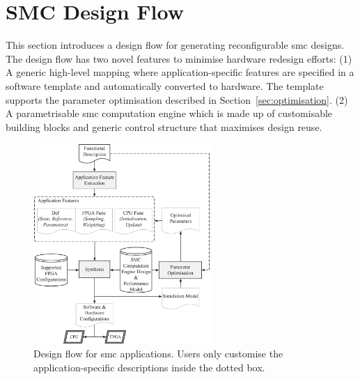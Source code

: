 

\section{SMC Design Flow}
\label{sec:design}

This section introduces a design flow for generating reconfigurable \gls{smc} 
designs. The design flow has two novel features to minimise hardware redesign efforts:
(1) A generic high-level mapping where application-specific features are specified in a software template and automatically converted to hardware.
The template supports the parameter optimisation described in Section~\ref{sec:optimisation}.
(2) A parametrisable \gls{smc} computation engine which is made up of customisable building blocks and generic control structure that maximises design reuse.

\begin{figure}[h]
\begin{center}
\includegraphics[width=0.6\textwidth]{design_flow/figures/flow}
\end{center}
\caption{Design flow for \gls{smc} applications. Users only customise the application-specific descriptions inside the dotted box.}
\label{fig:flow}
\end{figure}

